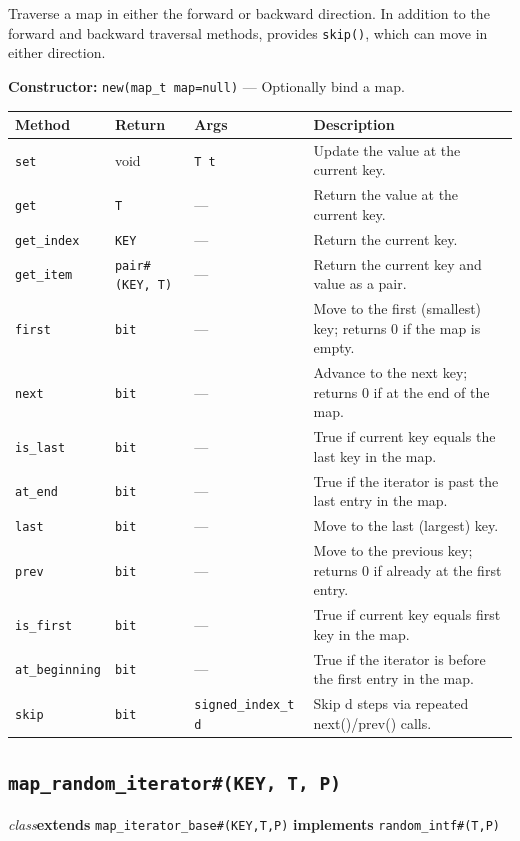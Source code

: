\documentclass[11pt,letterpaper]{report}
\begin{document}
Traverse a map in either the forward or backward direction. In addition to the forward and backward traversal methods, provides \texttt{skip()}, which can move in either direction.

\noindent\textbf{Constructor:} \texttt{new(map\_t map=null)} --- Optionally bind a map.

\begin{xltabular}{\linewidth}{>{\small}p{1.35in} >{\small}p{1.25in} >{\small}p{0.95in} >{\small}X}
\toprule
\textbf{Method} & \textbf{Return} & \textbf{Args} & \textbf{Description} \\
\midrule
\endhead
\bottomrule
\endfoot
\texttt{set} & void & \texttt{T t} & Update the value at the current key. \\
\texttt{get} & \texttt{T} & --- & Return the value at the current key. \\
\texttt{get\_index} & \texttt{KEY} & --- & Return the current key. \\
\texttt{get\_item} & \texttt{pair\#(KEY, T)} & --- & Return the current key and value as a pair. \\
\texttt{first} & \texttt{bit} & --- & Move to the first (smallest) key; returns 0 if the map is empty. \\
\texttt{next} & \texttt{bit} & --- & Advance to the next key; returns 0 if at the end of the map. \\
\texttt{is\_last} & \texttt{bit} & --- & True if current key equals the last key in the map. \\
\texttt{at\_end} & \texttt{bit} & --- & True if the iterator is past the last entry in the map. \\
\texttt{last} & \texttt{bit} & --- & Move to the last (largest) key. \\
\texttt{prev} & \texttt{bit} & --- & Move to the previous key; returns 0 if already at the first entry. \\
\texttt{is\_first} & \texttt{bit} & --- & True if current key equals first key in the map. \\
\texttt{at\_beginning} & \texttt{bit} & --- & True if the iterator is before the first entry in the map. \\
\texttt{skip} & \texttt{bit} & \texttt{signed\_index\_t d} & Skip d steps via repeated next()/prev() calls. \\
\end{xltabular}

\subsection*{\texttt{map\_random\_iterator\#(KEY, T, P)}}
\noindent\small\textit{class}\quad \textbf{extends} \texttt{map\_iterator\_base\#(KEY,T,P)} \quad \textbf{implements} \texttt{random\_intf\#(T,P)}\par
\end{document}
